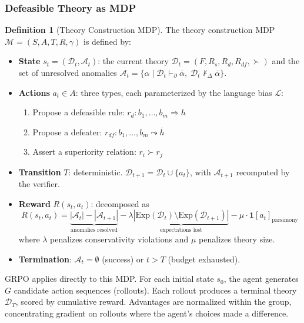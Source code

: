 \documentclass{article}
\theoremstyle{definition}
\newtheorem{definition}[theorem]{Definition}
\newcommand{\D}{\mathcal{D}}
\newcommand{\La}{\mathcal{L}}
\newcommand{\Rs}{R_s}
\newcommand{\Rd}{R_d}
\newcommand{\Rdf}{R_{df}}
\newcommand{\Exp}{\mathrm{Exp}}
\newcommand{\pPartial}{\vdash_{\partial}}
\newcommand{\defto}{\Rightarrow}
\newcommand{\defeatto}{\leadsto}
\newcommand{\comp}[1]{\overline{#1}}
\begin{document}
\subsubsection{Defeasible Theory as MDP}

\begin{definition}[Theory Construction MDP]\label{def:theory_mdp}
The theory construction MDP $\mathcal{M} = (S, A, T, R, \gamma)$ is defined by:
\begin{itemize}[nosep]
    \item \textbf{State} $s_t = (\D_t, \mathcal{A}_t)$: the current theory $\D_t = (F, \Rs, \Rd, \Rdf, {\succ})$ and the set of unresolved anomalies $\mathcal{A}_t = \{\alpha \mid \D_t \pPartial \comp{\alpha},\; \D_t \not\vdash_\Delta \comp{\alpha}\}$.
    \item \textbf{Actions} $a_t \in A$: three types, each parameterized by the language bias $\La$:
    \begin{enumerate}[nosep]
        \item Propose a defeasible rule: $r_d\colon b_1, \ldots, b_m \defto h$
        \item Propose a defeater: $r_{df}\colon b_1, \ldots, b_m \defeatto \comp{h}$
        \item Assert a superiority relation: $r_i \succ r_j$
    \end{enumerate}
    \item \textbf{Transition} $T$: deterministic. $\D_{t+1} = \D_t \cup \{a_t\}$, with $\mathcal{A}_{t+1}$ recomputed by the verifier.
    \item \textbf{Reward} $R(s_t, a_t)$: decomposed as
    \[
        R(s_t, a_t) = \underbrace{|\mathcal{A}_t| - |\mathcal{A}_{t+1}|}_{\text{anomalies resolved}} - \lambda \underbrace{|\Exp(\D_t) \setminus \Exp(\D_{t+1})|}_{\text{expectations lost}} - \mu \cdot \mathbf{1}[a_t]_{\text{parsimony}}
    \]
    where $\lambda$ penalizes conservativity violations and $\mu$ penalizes theory size.
    \item \textbf{Termination}: $\mathcal{A}_t = \emptyset$ (success) or $t > T$ (budget exhausted).
\end{itemize}
\end{definition}

GRPO applies directly to this MDP. For each initial state $s_0$, the agent generates $G$ candidate action sequences (rollouts). Each rollout produces a terminal theory $\D_T$, scored by cumulative reward. Advantages are normalized within the group, concentrating gradient on rollouts where the agent's choices made a difference.
\end{document}
